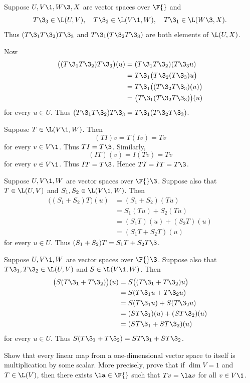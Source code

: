 \begin{Solution}
Suppose $U, V\1, W\3, X$ are vector spaces over $\F{}$ and
\[
T\3_3 \in \L(U, V), \quad T\3_2 \in \L(V\1, W),\quad T\3_1 \in \L(W\3, X).
\]
Thus $(T\3_1 T\3_2) T\3_3$ and $T\3_1(T\3_2 T\3_3)$ are both elements of $\L(U, X)$.

Now
\begin{align*}
\bigl( (T\3_1 T\3_2) T\3_3 \bigr)(u) &= (T\3_1 T\3_2)(T\3_3 u) \\
&= T\3_1 \bigl( T\3_2(T\3_3) u \bigr) \\
&= T\3_1 \bigl( (T\3_2 T\3_3)(u) \bigr)\\
&= \bigl( T\3_1(T\3_2 T\3_3) \bigr)(u)
\end{align*}
for every $u \in U$. Thus $(T\3_1 T\3_2) T\3_3 = T\3_1(T\3_2 T\3_3)$.

Suppose $T \in \L(V\1, W)$. Then
\[
(TI)v = T(Iv) = Tv
\]
for every $v \in V\1$. Thus $TI = T\3$. Similarly,
\[
(IT)(v) = I(Tv) = Tv
\]
for every $v \in V\1$. Thus $IT = T\3$. Hence $TI = IT = T\3$.

Suppose $U, V\1, W$ are vector spaces over $\F{}\3$. Suppose also that $T \in \L(U, V)$ and $S_1, S_2 \in \L(V\1, W)$. Then
\begin{align*}
\bigl( (S_1 + S_2)T  \bigr)(u) &= (S_1 + S_2)(Tu) \\
&= S_1(Tu) + S_2(Tu) \\
&= (S_1 T)(u) + (S_2 T)(u) \\
&= (S_1 T + S_2 T)(u)
\end{align*}
for every $u \in U$. Thus $(S_1 + S_2)T = S_1 T + S_2 T\3$.

Suppose $U, V\1, W$ are vector spaces over $\F{}\3$. Suppose also that $T\3_1, T\3_2 \in \L(U, V)$ and $S \in \L(V\1, W)$. Then
\begin{align*}
\bigl( S(T\3_1 + T\3_2) \bigr)(u) &= S\bigl((T\3_1 + T\3_2)u\bigr) \\
&= S(T\3_1u + T\3_2 u) \\
&= S(T\3_1 u) + S(T\3_2u)\\
&= (S T\3_1)(u) + (S T\3_2)(u) \\
&= (ST\3_1 + ST\3_2)(u)
\end{align*}
for every $u \in U$. Thus $S(T\3_1 + T\3_2) = ST\3_1 + ST\3_2$.
\end{Solution}

\exercise
Show that every linear map from a one-dimensional vector space to
itself is multiplication by some scalar.  More precisely, prove that
if $\dim V = 1$ and $T \in \L(V)$, then there exists $\la \in \F{}$ such
that $Tv = \la v$ for all $v \in V\1$. \label{dualone}

